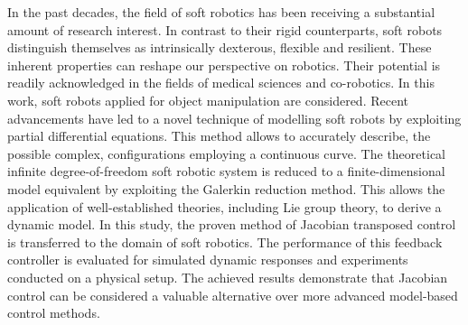 In the past decades, the field of soft robotics has been receiving a substantial amount of research interest. In contrast to their rigid counterparts, soft robots distinguish themselves as intrinsically dexterous, flexible and resilient. These inherent properties can reshape our perspective on robotics. Their potential is readily acknowledged in the fields of medical sciences and co-robotics. In this work, soft robots applied for object manipulation are considered. Recent advancements have led to a novel technique of modelling soft robots by exploiting partial differential equations. This method allows to accurately describe, the possible complex, configurations employing a continuous curve. The theoretical infinite degree-of-freedom soft robotic system is reduced to a finite-dimensional model equivalent by exploiting the Galerkin reduction method. This allows the application of well-established theories, including Lie group theory, to derive a dynamic model. In this study, the proven method of Jacobian transposed control is transferred to the domain of soft robotics. The performance of this feedback controller is evaluated for simulated dynamic responses and experiments conducted on a physical setup. The achieved results demonstrate that Jacobian control can be considered a valuable alternative over more advanced model-based control methods.